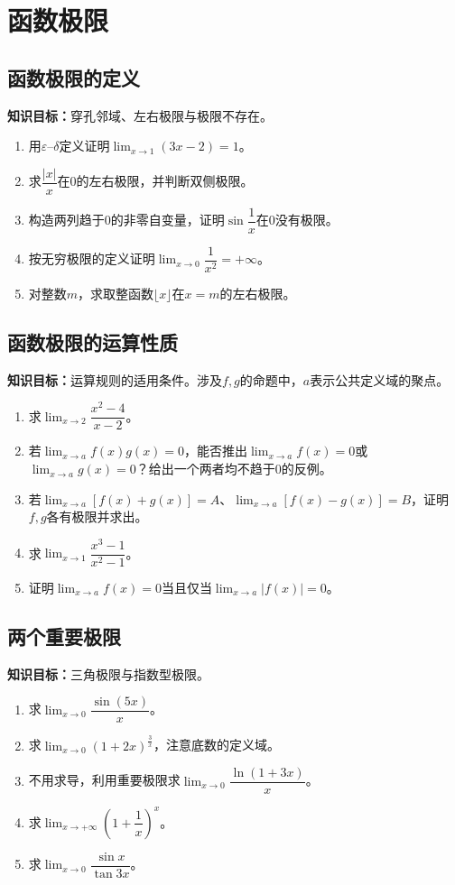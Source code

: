 \documentclass[11pt,a4paper,fontset=fandol]{ctexrep}
\newcommand{\goal}[1]{\textbf{知识目标：}#1\par}
\begin{document}
\section{函数极限}
\subsection{函数极限的定义}
\goal{穿孔邻域、左右极限与极限不存在。}
\begin{enumerate}
\item 用$\varepsilon$--$\delta$定义证明$\lim_{x\to1}(3x-2)=1$。
\item 求$\dfrac{|x|}{x}$在$0$的左右极限，并判断双侧极限。
\item 构造两列趋于$0$的非零自变量，证明$\sin\dfrac{1}{x}$在$0$没有极限。
\item 按无穷极限的定义证明$\lim_{x\to0}\dfrac{1}{x^2}=+\infty$。
\item 对整数$m$，求取整函数$\lfloor x\rfloor$在$x=m$的左右极限。
\end{enumerate}
\subsection{函数极限的运算性质}
\goal{运算规则的适用条件。涉及$f,g$的命题中，$a$表示公共定义域的聚点。}
\begin{enumerate}
\item 求$\lim_{x\to2}\dfrac{x^2-4}{x-2}$。
\item 若$\lim_{x\to a}f(x)g(x)=0$，能否推出$\lim_{x\to a}f(x)=0$或$\lim_{x\to a}g(x)=0$？给出一个两者均不趋于$0$的反例。
\item 若$\lim_{x\to a}[f(x)+g(x)]=A$、$\lim_{x\to a}[f(x)-g(x)]=B$，证明$f,g$各有极限并求出。
\item 求$\lim_{x\to1}\dfrac{x^3-1}{x^2-1}$。
\item 证明$\lim_{x\to a}f(x)=0$当且仅当$\lim_{x\to a}|f(x)|=0$。
\end{enumerate}
\subsection{两个重要极限}
\goal{三角极限与指数型极限。}
\begin{enumerate}
\item 求$\lim_{x\to0}\dfrac{\sin(5x)}{x}$。
\item 求$\lim_{x\to0}(1+2x)^{\frac{3}{x}}$，注意底数的定义域。
\item 不用求导，利用重要极限求$\lim_{x\to0}\dfrac{\ln(1+3x)}{x}$。
\item 求$\lim_{x\to+\infty}\left(1+\dfrac{1}{x}\right)^x$。
\item 求$\lim_{x\to0}\dfrac{\sin x}{\tan3x}$。
\end{enumerate}
\end{document}
